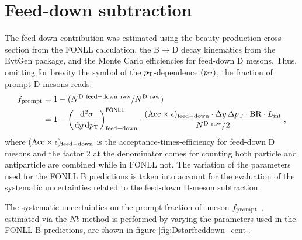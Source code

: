 \section{Feed-down subtraction}

The feed-down contribution was estimated using 
the beauty production cross section from the FONLL calculation,
the B$\rightarrow$D decay kinematics from the EvtGen package,
and the Monte Carlo efficiencies for feed-down D mesons. 
Thus, omitting for brevity the symbol of the $p_{\rm T}$-dependence $(p_{\rm T})$, 
the fraction of prompt D mesons reads:
\begin{equation}
 \label{eq:fcNbMethod}
 \begin{split}
   f_{\rm prompt} &= 1-(N^{\rm D~feed-down~raw}/N^{\rm D~raw})\\
   &= 1 -  \left( \frac{{\rm d}^2 \sigma}{{\rm d}y \, {\rm d}p_{\rm T} }
\right)^{{\sf FONLL}} _{{\rm feed-down}} \cdot
\frac{({\rm Acc}\times\epsilon)_{\rm feed-down}\cdot\Delta y \, \Delta p_{\rm T}
\cdot {\rm BR} \cdot L_{\rm int}  }{ N^{\rm D~raw }  / 2} \, ,
 \end{split}
\end{equation}
where $({\rm Acc}\times\epsilon)_{{\rm feed-down}}$ is the 
acceptance-times-efficiency for feed-down D mesons and the factor 2 at the denominator
comes for counting both particle and antiparticle
are combined while in FONLL not. The variation of the parameters used for the FONLL B predictions is taken into account for the evaluation of the systematic uncertainties related to the feed-down D-meson subtraction.

The systematic uncertainties on the prompt fraction of \Dstar -meson $f_{\rm prompt}$ , estimated via the $Nb$ method is performed by varying the parameters used in the FONLL B predictions, are shown in figure \ref{fig:Dstarfeeddown_cent}.

